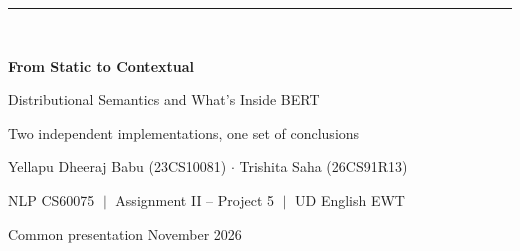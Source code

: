 \documentclass[aspectratio=169,9pt,t]{beamer}
\begin{document}
{
\begin{frame}[plain]
  \vspace{0.6cm}
  {\color{Teal!35}\rule{1.2cm}{3pt}}\\[0.5cm]
  {\LARGE\bfseries\color{white}From Static to Contextual\par}
  \vspace{0.1cm}
  {\large\color{white!85}Distributional Semantics and What's Inside BERT\par}
  \vspace{0.6cm}
  {\color{white!85}\Large Two independent implementations, one set of conclusions\par}
  \vspace{0.9cm}
  {\color{white}Yellapu Dheeraj Babu (23CS10081) \quad $\cdot$ \quad Trishita Saha (26CS91R13)\par}
  \vspace{0.2cm}
  {\color{white!80}NLP CS60075 $\;|\;$ Assignment II -- Project 5 $\;|\;$ UD English EWT\par}
  \vfill
  {\color{white!65}\small Common presentation \hfill November 2026}
\end{frame}}
\end{document}
